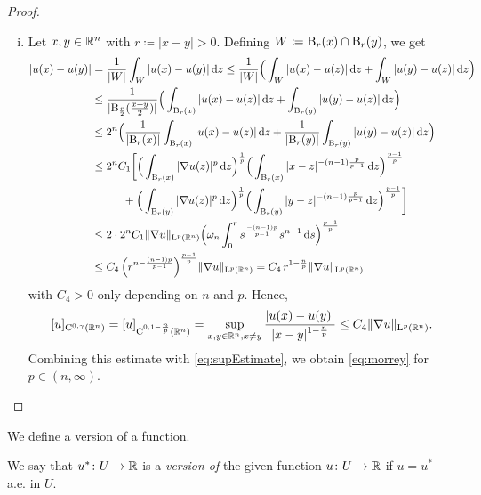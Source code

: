 \begin{proof}
\begin{enumerate}[i)]
    \item Let $x, y \in \mathbb{R}^n$ with $r \coloneqq |x - y| > 0$.
      Defining $W \coloneqq \mathrm{B}_r(x) \cap \mathrm{B}_r(y)$, we get
      \begin{align*}
        |u(x) - u(y)|
        &= \frac{1}{|W|} \int_W |u(x) - u(y)| \d z
        \leq \frac{1}{|W|} \Big(\int_W |u(x) - u(z)| \d z + \int_W |u(y) - u(z)| \d z \Big) \\
        &\leq \frac{1}{|\BB_{\frac{r}{2}}(\frac{x + y}{2})|} \Big( \int_{\BB_r(x)} |u(x) - u(z)|\d z + \int_{\BB_r(y)} |u(y) - u(z)| \d z \Big) \\
        &\leq 2^n \Big( \frac{1}{|\BB_r(x)|} \int_{\BB_r(x)} |u(x) - u(z)| \d z + \frac{1}{|\BB_r(y)|} \int_{\BB_r(y)} |u(y) - u(z)| \d z \Big) \\
        &\leq 2^n C_1 \bigg[ \Big( \int_{\BB_r(x)} |\nabla u(z)|^p \d z \Big)^{\frac{1}{p}} \Big( \int_{\BB_r(x)} |x - z|^{-(n - 1)\frac{p}{p - 1}} \d z \Big)^{\frac{p - 1}{p}} \\
        &\hspace{2.8em} + \Big( \int_{\BB_r(y)} |\nabla u(z)|^p \d z \Big)^{\frac{1}{p}} \Big( \int_{\BB_r(y)} |y - z|^{-(n - 1)\frac{p}{p - 1}} \d z \Big)^{\frac{p - 1}{p}} \bigg] \\
        &\leq 2 \cdot 2^n C_1 \|\nabla u\|_{\Ell^p(\R^n)} \Big( \omega_n \int_0^r s^{\frac{-(n - 1)p}{p - 1}} s^{n - 1} \d s \Big)^{\frac{p - 1}{p}} \\
        &\leq C_4 \, \Big( r^{n - \frac{(n - 1)p}{p - 1}} \Big)^{\frac{p - 1}{p}} \|\nabla u\|_{\Ell^p(\R^n)} 
        = C_4 \, r^{1 - \frac{n}{p}} \|\nabla u\|_{\Ell^p(\R^n)}
      \end{align*}
      with $C_4 > 0$ only depending on $n$ and $p$.
      Hence,
      $$
      [u]_{\mathrm{C}^{0,\gamma}(\mathbb{R}^n)}
      = [u]_{\mathrm{C}^{0,1 - \frac{n}{p}}(\mathbb{R}^n)}
      = \sup_{x,y \in \mathbb{R}^n, x \neq y} \frac{|u(x) - u(y)|}{|x - y|^{1 - \frac{n}{p}}}
      \leq C_4 \|\nabla u\|_{\mathrm{L}^p(\mathbb{R}^n)}.
      $$
      Combining this estimate with \eqref{eq:supEstimate}, we obtain \eqref{eq:morrey} for $p \in (n,\infty)$. \qedhere
  \end{enumerate}
\end{proof}

We define a version of a function.

\begin{defn}
  We say that $u^* \colon U \to \mathbb{R}$ is a \emph{version of} the given function $u \colon U \to \mathbb{R}$ if $u = u^*$ a.e. in $U$.
\end{defn}

